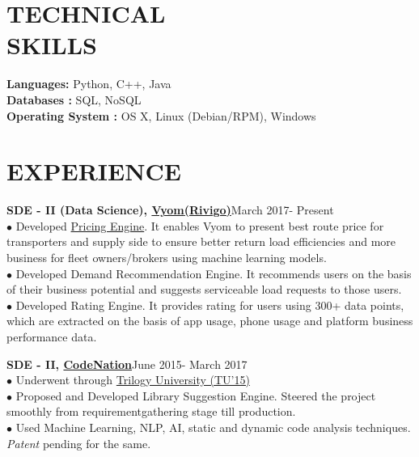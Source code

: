 \documentclass[margin,line]{resume}
\begin{document}
\begin{resume}
    \section{\mysidestyle \bf TECHNICAL \\ SKILLS} 
    {\bf Languages:}\label{sec:\mysidestyle\bftechnical\\skills} Python, C++, Java
    \\ {\bf Databases :} SQL, NoSQL
     \\ {\bf Operating System :} OS X, Linux (Debian/RPM), Windows
   
    \section{\mysidestyle \bf EXPERIENCE}
    {\bf SDE - II (Data Science), \href{https://www.vyom.com/}{Vyom}\href{https://www.rivigo.com/}{(Rivigo)}}\label{sec:\mysidestyle\bfexperience}\hfill March 2017- Present\\
      $\bullet$ Developed \href{https://eng.rivigo.com/technology/dynamic-prediction-of-trucking-freight-prices-to-digitize-the-indian-trucking-economy/}{Pricing Engine}.
      It enables Vyom to present best route price for transporters and supply side to ensure better return load efficiencies and more business for fleet owners/brokers using machine learning models.\\
  $\bullet$ Developed Demand Recommendation Engine.
  It recommends users on the basis of their business potential and suggests serviceable load requests to those users. \\
    $\bullet$ Developed Rating Engine.
    It provides rating for users using 300+ data points, which are extracted on the basis of app usage, phone usage and platform business performance data.

{\bf SDE - II, \href{http://codenation.co.in/}{CodeNation}}\hfill June 2015- March 2017\\
      $\bullet$ Underwent through \href{https://hbr.org/2001/04/no-ordinary-boot-camp}{Trilogy University (TU'15)}\\
	$\bullet$ Proposed and Developed Library Suggestion Engine.
	Steered the project smoothly from requirement\linebreak gathering stage till production. \\
	$\bullet$ Used Machine Learning, NLP, AI, static and dynamic code analysis techniques. \emph{Patent} pending for the same.
    

\end{resume}
\end{document}
